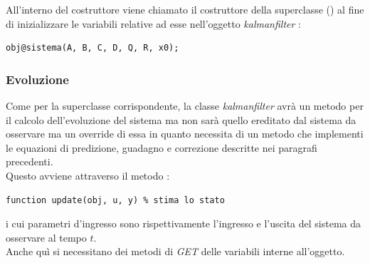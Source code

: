 All'interno del costruttore viene chiamato il costruttore della superclasse () al fine di inizializzare le variabili relative ad esse nell'oggetto \textit{kalmanfilter} :
\begin{lstlisting}[frame=single]
	obj@sistema(A, B, C, D, Q, R, x0);
\end{lstlisting}

\subsubsection{Evoluzione}
Come per la superclasse corrispondente, la classe \textit{kalmanfilter} avrà un metodo per il calcolo dell'evoluzione del sistema ma non sarà quello ereditato dal sistema da osservare ma un override di essa in quanto necessita di un metodo che implementi le equazioni di predizione, guadagno e correzione descritte nei paragrafi precedenti.\\
Questo avviene attraverso il metodo :
\begin{lstlisting}[frame=single]
function update(obj, u, y) % stima lo stato
\end{lstlisting}
i cui parametri d'ingresso sono rispettivamente l'ingresso e l'uscita del sistema da osservare al tempo $t$.\\
Anche quì si necessitano dei metodi di \textit{GET} delle variabili interne all'oggetto.
\newpage

